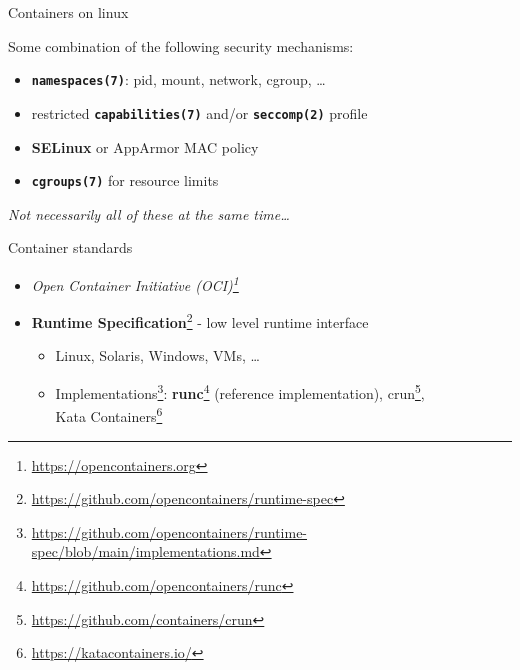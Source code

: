 \documentclass[ignorenonframetext,aspectratio=169,12pt]{beamer}
\begin{document}
\begin{frame}{Containers on linux}
\protect\hypertarget{container-linux}{}

Some combination of the following security mechanisms:

\begin{itemize}
  \item \textbf{\texttt{namespaces(7)}}: pid, mount, network, cgroup, \ldots{}
  \item restricted \textbf{\texttt{capabilities(7)}} and/or \textbf{\texttt{seccomp(2)}} profile
  \item {\bf SELinux} or AppArmor MAC policy
  \item \textbf{\texttt{cgroups(7)}} for resource limits
\end{itemize}

\emph{Not necessarily all of these at the same time\ldots{}}

\end{frame}

\begin{frame}{Container standards}
\protect\hypertarget{container-standards}{}
\begin{itemize}
    \item {\em Open Container Initiative (OCI)\footnote{\url{https://opencontainers.org}}}
    \item {\bf Runtime Specification}\footnote{\url{https://github.com/opencontainers/runtime-spec}} - low level runtime interface
    \begin{itemize}
        \item Linux, Solaris, Windows, VMs, \ldots{}
        \item Implementations\footnote{\url{https://github.com/opencontainers/runtime-spec/blob/main/implementations.md}}:
          {\bf runc}\footnote{\url{https://github.com/opencontainers/runc}} (reference implementation),
          crun\footnote{\url{https://github.com/containers/crun}}, \\
          Kata Containers\footnote{\url{https://katacontainers.io/}}
    \end{itemize}
\end{itemize}
\end{frame}
\end{document}
